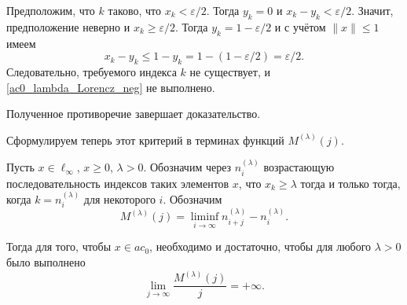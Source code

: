 Предположим, что $k$ таково, что $x_k < \varepsilon/2$.
Тогда $y_k = 0$ и $x_k - y_k < \varepsilon/2$.
Значит, предположение неверно и $x_k \geq \varepsilon/2$.
Тогда $y_k = 1-\varepsilon/2$ и с учётом $\|x\|\leq 1$ имеем
\begin{equation}
	x_k - y_k \leq 1- y_k = 1 - (1-\varepsilon/2) = \varepsilon/2
	.
\end{equation}
Следовательно, требуемого индекса $k$ не существует,
и \eqref{ac0_lambda_Lorencz_neg} не выполнено.

Полученное противоречие завершает доказательство.

Сформулируем теперь этот критерий в терминах функций $M^{(\lambda)}(j)$.

\begin{corollary}
	\label{thm:crit_ac0_Mj_lambda}
	Пусть $x\in\ell_\infty$, $x \geq 0$, $\lambda>0$.
	Обозначим через $n^{(\lambda)}_i$ возрастающую последовательность
	индексов таких элементов $x$, что $x_k \geq \lambda$ тогда и только тогда,
	когда $k=n^{(\lambda)}_i$ для некоторого $i$.
	Обозначим
	\begin{equation}
		M^{(\lambda)}(j) = \liminf_{i\to\infty} n^{(\lambda)}_{i+j} - n^{(\lambda)}_i
		.
	\end{equation}


	Тогда для того, чтобы $x\in ac_0$, необходимо и достаточно, чтобы
	для любого $\lambda>0$ было выполнено
	\begin{equation}
		\lim_{j \to \infty} \frac{M^{(\lambda)}(j)}{j} = +\infty
		.
	\end{equation}
\end{corollary}
